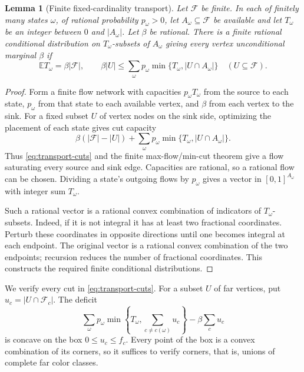 \documentclass[11pt]{article}
\newtheorem{lemma}[theorem]{Lemma}
\theoremstyle{definition}
\theoremstyle{remark}
\begin{document}
\begin{lemma}[Finite fixed-cardinality transport]
\label{lem:transport}
Let $\mathcal F$ be finite.  In each of finitely many states $\omega$,
of rational probability $p_\omega>0$, let $A_\omega\subseteq\mathcal F$
be available and let $T_\omega$ be an integer between $0$ and
$|A_\omega|$.  Let $\beta$ be rational.  There is a finite rational
conditional distribution on $T_\omega$-subsets of $A_\omega$ giving
every vertex unconditional marginal $\beta$ if
\begin{equation}
 \mathbb E T_\omega=\beta|\mathcal F|,\qquad
 \beta|U|\le\sum_\omega p_\omega
             \min\{T_\omega,|U\cap A_\omega|\}\quad(U\subseteq\mathcal F).
 \label{eq:transport-cuts}
\end{equation}
\end{lemma}
\begin{proof}
Form a finite flow network with capacities $p_\omega T_\omega$ from
the source to each state, $p_\omega$ from that state to each available
vertex, and $\beta$ from each vertex to the sink.  For a fixed subset
$U$ of vertex nodes on the sink side, optimizing the placement of each
state gives cut capacity
\[
 \beta(|\mathcal F|-|U|)+
   \sum_\omega p_\omega\min\{T_\omega,|U\cap A_\omega|\}.
\]
Thus \eqref{eq:transport-cuts} and the finite max-flow/min-cut theorem
give a flow saturating every source and sink edge.  Capacities are
rational, so a rational flow can be chosen.  Dividing a state's outgoing
flows by $p_\omega$ gives a vector in $[0,1]^{A_\omega}$ with integer
sum $T_\omega$.

Such a rational vector is a rational convex combination of indicators
of $T_\omega$-subsets.  Indeed, if it is not integral it has at least
two fractional coordinates.  Perturb these coordinates in opposite
directions until one becomes integral at each endpoint.  The original
vector is a rational convex combination of the two endpoints; recursion
reduces the number of fractional coordinates.  This constructs the
required finite conditional distributions.
\end{proof}

We verify every cut in \eqref{eq:transport-cuts}.  For a subset $U$ of
far vertices, put $u_c=|U\cap\mathcal F_c|$.  The deficit
\[
 \sum_\omega p_\omega
   \min\left\{T_\omega,\sum_{c\ne c(\omega)}u_c\right\}
       -\beta\sum_c u_c
\]
is concave on the box $0\le u_c\le f_c$.  Every point of the box is a
convex combination of its corners, so it suffices to verify corners,
that is, unions of complete far color classes.
\end{document}
